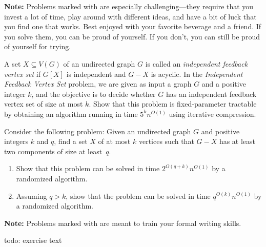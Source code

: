 \documentclass{uebung_cs}
\begin{document}
\textbf{Note:} Problems marked with \hard are especially challenging---they require that you invest a lot of time, play around with different ideas, and have a bit of luck that you find one that works. Best enjoyed with your favorite beverage and a friend. If you solve them, you can be proud of yourself. If you don't, you can still be proud of yourself for trying.

\begin{exercise}
A set $X \subseteq V(G)$ of an undirected graph $G$ is called an \emph{independent feedback vertex set} if $G[X]$ is independent and $G - X$ is acyclic. In the \emph{Independent Feedback Vertex Set} problem, we are given as input a graph $G$ and a positive integer $k$, and the objective is to decide whether $G$ has an independent feedback vertex set of size at most $k$. Show that this problem is fixed-parameter tractable by obtaining an algorithm running in time $5^kn^{O(1)}$ using iterative compression.
\end{exercise}

\begin{exercise}[\hard]
Consider the following problem: Given an undirected graph $G$ and positive integers $k$ and $q$, find a set $X$ of at most $k$ vertices such that $G - X$ has at least two components of size at least~$q$.
\begin{enumerate}
\item Show that this problem can be solved in time $2^{O(q+k)}n^{O(1)}$ by a randomized algorithm.
\item Assuming $q>k$, show that the problem can be solved in time $q^{O(k)}n^{O(1)}$ by a randomized algorithm.
\end{enumerate}
\end{exercise}


\newpage
\textbf{Note:} Problems marked with \schriftlich are meant to train your formal writing skills.

\begin{exercise}
  todo: exercise text
\end{exercise}
\end{document}
